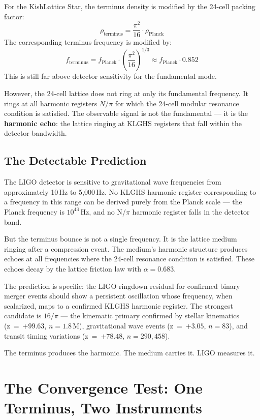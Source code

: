 \documentclass[11pt, letterpaper, openany]{book}
\begin{document}
For the KishLattice Star, the terminus density is modified by the 24-cell
packing factor:
\[
\rho_\text{terminus} = \frac{\pi^2}{16} \cdot \rho_\text{Planck}
\]
The corresponding terminus frequency is modified by:
\[
f_\text{terminus} = f_\text{Planck} \cdot \left(\frac{\pi^2}{16}\right)^{1/3}
\approx f_\text{Planck} \cdot 0.852
\]
This is still far above detector sensitivity for the fundamental mode.

However, the 24-cell lattice does not ring at only its fundamental frequency.
It rings at all harmonic registers $N/\pi$ for which the 24-cell modular
resonance condition is satisfied. The observable signal is not the fundamental
--- it is the \textbf{harmonic echo}: the lattice ringing at KLGHS registers
that fall within the detector bandwidth.

\section{The Detectable Prediction}

The LIGO detector is sensitive to gravitational wave frequencies from
approximately 10\,Hz to 5,000\,Hz. No KLGHS harmonic register corresponding
to a frequency in this range can be derived purely from the Planck scale ---
the Planck frequency is $10^{43}$\,Hz, and no N/$\pi$ harmonic register
falls in the detector band.

But the terminus bounce is not a single frequency. It is the lattice medium
ringing after a compression event. The medium's harmonic structure produces
echoes at all frequencies where the 24-cell resonance condition is satisfied.
These echoes decay by the lattice friction law with $\alpha = 0.683$.

The prediction is specific: the LIGO ringdown residual for confirmed binary
merger events should show a persistent oscillation whose frequency, when
scalarized, maps to a confirmed KLGHS harmonic register. The strongest
candidate is $16/\pi$ --- the kinematic primary confirmed by stellar
kinematics (z~=~$+99.63$, $n = 1.8$\,M), gravitational wave events
(z~=~$+3.05$, $n = 83$), and transit timing variations (z~=~$+78.48$,
$n = 290,458$).

The terminus produces the harmonic. The medium carries it. LIGO measures it.

\clearpage
\chapter{The Convergence Test: One Terminus, Two Instruments}
\end{document}
